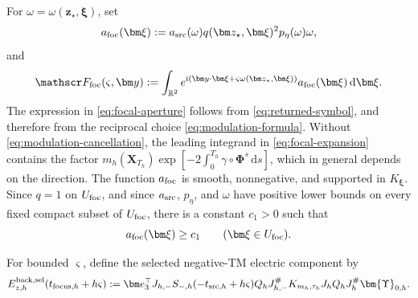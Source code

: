 \documentclass[11pt,reqno]{amsart}
\newcommand{\ii}{\mathrm{i}}
\newcommand{\dd}{\,\mathrm{d}}
\numberwithin{equation}{section}
\begin{document}
For $\omega=\omega(\bm z_\star,\bm\xi)$, set
\begin{equation}\label{eq:focal-aperture}
 a_{\rm foc}(\bm\xi):= a_{\rm src}(\omega)q(\bm z_\star,\bm\xi)^2p_\eta(\omega)\omega,
\end{equation}
and
\begin{equation*}
 \mathscr F_{\rm foc}(\varsigma,\bm y):=\int_{\mathbb R^2}e^{\ii(\bm y\cdot\bm\xi+\varsigma\omega(\bm z_\star,\bm\xi))}a_{\rm foc}(\bm\xi)\dd\bm\xi.
\end{equation*}
The expression in \eqref{eq:focal-aperture} follows from \eqref{eq:returned-symbol}, and therefore from the reciprocal choice \eqref{eq:modulation-formula}. Without \eqref{eq:modulation-cancellation}, the leading integrand in \eqref{eq:focal-expansion} contains the factor $m_h(\bm X_{T_h})\exp[-2\int_0^{T_h}\gamma\circ\bm\Phi^s\dd s]$, which in general depends on the direction.
The function $a_{\rm foc}$ is smooth, nonnegative, and supported in $K_{\bm\xi}$. Since $q=1$ on $U_{\rm foc}$, and since $a_{\rm src}$, $p_\eta$, and $\omega$ have positive lower bounds on every fixed compact subset of $U_{\rm foc}$, there is a constant $c_1>0$ such that
\begin{equation}\label{eq:focal-aperture-lower-bound}
 a_{\rm foc}(\bm\xi)\ge c_1\qquad(\bm\xi\in U_{\rm foc}).
\end{equation}

For bounded $\varsigma$, define the selected negative-TM electric component by
\begin{equation*}
E_{z,h}^{\rm back,sel}(t_{{\rm focus},h}+h\varsigma):=\bm e_3^\top J_{h,-}S_{-,h}(-t_{{\rm src},h}+h\varsigma)Q_hJ_{h,-}^{\#}K_{m_h,\tau_h}J_hQ_hJ_h^{\#}\bm{\Upsilon}_{0,h}.
\end{equation*}
\end{document}
